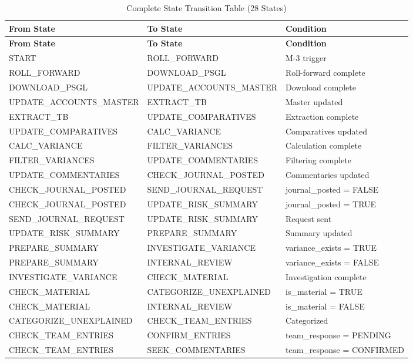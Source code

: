 \begin{longtable}{p{3.5cm} p{3.5cm} p{5.5cm}}
\caption{Complete State Transition Table (28 States)} \\
\toprule
\textbf{From State} & \textbf{To State} & \textbf{Condition} \\
\midrule
\endfirsthead
\toprule
\textbf{From State} & \textbf{To State} & \textbf{Condition} \\
\midrule
\endhead
START & ROLL\_FORWARD & M-3 trigger \\
ROLL\_FORWARD & DOWNLOAD\_PSGL & Roll-forward complete \\
DOWNLOAD\_PSGL & UPDATE\_ACCOUNTS\_MASTER & Download complete \\
UPDATE\_ACCOUNTS\_MASTER & EXTRACT\_TB & Master updated \\
EXTRACT\_TB & UPDATE\_COMPARATIVES & Extraction complete \\
UPDATE\_COMPARATIVES & CALC\_VARIANCE & Comparatives updated \\
CALC\_VARIANCE & FILTER\_VARIANCES & Calculation complete \\
FILTER\_VARIANCES & UPDATE\_COMMENTARIES & Filtering complete \\
UPDATE\_COMMENTARIES & CHECK\_JOURNAL\_POSTED & Commentaries updated \\
CHECK\_JOURNAL\_POSTED & SEND\_JOURNAL\_REQUEST & journal\_posted = FALSE \\
CHECK\_JOURNAL\_POSTED & UPDATE\_RISK\_SUMMARY & journal\_posted = TRUE \\
SEND\_JOURNAL\_REQUEST & UPDATE\_RISK\_SUMMARY & Request sent \\
UPDATE\_RISK\_SUMMARY & PREPARE\_SUMMARY & Summary updated \\
PREPARE\_SUMMARY & INVESTIGATE\_VARIANCE & variance\_exists = TRUE \\
PREPARE\_SUMMARY & INTERNAL\_REVIEW & variance\_exists = FALSE \\
INVESTIGATE\_VARIANCE & CHECK\_MATERIAL & Investigation complete \\
CHECK\_MATERIAL & CATEGORIZE\_UNEXPLAINED & is\_material = TRUE \\
CHECK\_MATERIAL & INTERNAL\_REVIEW & is\_material = FALSE \\
CATEGORIZE\_UNEXPLAINED & CHECK\_TEAM\_ENTRIES & Categorized \\
CHECK\_TEAM\_ENTRIES & CONFIRM\_ENTRIES & team\_response = PENDING \\
CHECK\_TEAM\_ENTRIES & SEEK\_COMMENTARIES & team\_response = CONFIRMED \\

\end{longtable}
